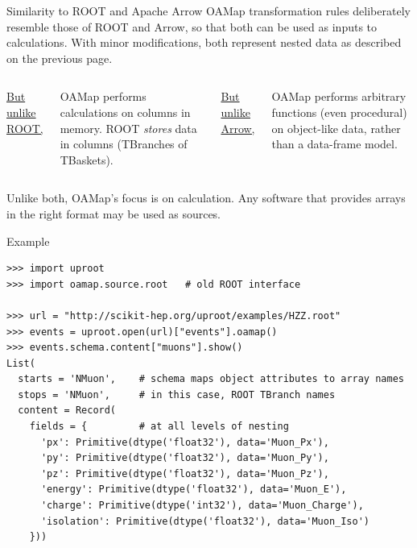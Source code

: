 \documentclass[aspectratio=169]{beamer}
\begin{document}
\begin{frame}{Similarity to ROOT and Apache Arrow}
\vspace{0.5 cm}
OAMap transformation rules deliberately resemble those of ROOT and Arrow, so that both can be used as inputs to calculations. With minor modifications, both represent nested data as described on the previous page.

\vspace{-0.2 cm}
\begin{columns}[t]
\begin{center}
\large \underline{But unlike ROOT,}
\end{center}

OAMap performs calculations on columns in memory. ROOT {\it stores} data in columns (TBranches of TBaskets).

\begin{center}
\large \underline{But unlike Arrow,}
\end{center}

OAMap performs arbitrary functions (even procedural) on object-like data, rather than a data-frame model.
\end{columns}

\vspace{0.7 cm}
Unlike both, OAMap's focus is on calculation. Any software that provides arrays in the right format may be used as sources.
\end{frame}

\begin{frame}[fragile]{Example}
\small
\begin{verbatim}
>>> import uproot
>>> import oamap.source.root   # old ROOT interface

>>> url = "http://scikit-hep.org/uproot/examples/HZZ.root"
>>> events = uproot.open(url)["events"].oamap()
>>> events.schema.content["muons"].show()
List(
  starts = 'NMuon',    # schema maps object attributes to array names
  stops = 'NMuon',     # in this case, ROOT TBranch names
  content = Record(
    fields = {         # at all levels of nesting
      'px': Primitive(dtype('float32'), data='Muon_Px'),
      'py': Primitive(dtype('float32'), data='Muon_Py'),
      'pz': Primitive(dtype('float32'), data='Muon_Pz'),
      'energy': Primitive(dtype('float32'), data='Muon_E'),
      'charge': Primitive(dtype('int32'), data='Muon_Charge'),
      'isolation': Primitive(dtype('float32'), data='Muon_Iso')
    }))
\end{verbatim}
\end{frame}
\end{document}

